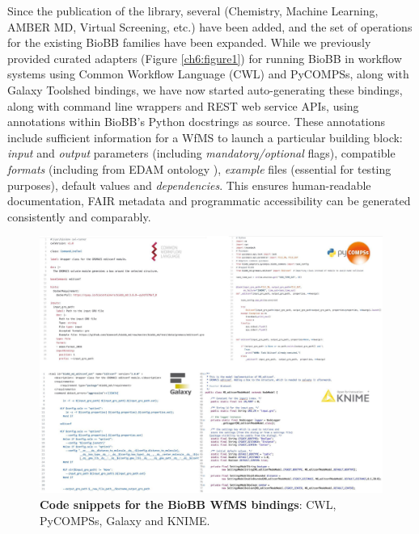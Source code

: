 Since the publication of the library, several  (Chemistry, Machine Learning, AMBER MD, Virtual Screening, etc.) have been added, and the set of operations for the existing BioBB families have been expanded.
While we previously provided curated adapters (Figure \vref{ch6:figure1}) for running BioBB in workflow systems using Common Workflow Language (CWL) and PyCOMPSs, along with Galaxy Toolshed bindings, we have now started auto-generating these bindings, along with command line wrappers and REST web service APIs, using annotations within BioBB's Python docstrings as source.
These annotations include sufficient information for a WfMS to launch a particular building block: \emph{input} and \emph{output} parameters (including \emph{mandatory/optional} flags), compatible \emph{formats} (including from EDAM ontology \cite{ch6-11}), \emph{example} files (essential for testing purposes), default values and \emph{dependencies}.
This ensures human-readable documentation, FAIR metadata and programmatic accessibility can be generated consistently and comparably.

\begin{figure}%
  \includegraphics[width=\textwidth]{figures/ch06/figure1.jpg}
	\caption[Code snippets for the BioBB WfMS bindings]{
    \textbf{Code snippets for the BioBB WfMS bindings}: 
    CWL, PyCOMPSs, Galaxy and KNIME.}
  \label{ch6:figure1}
\end{figure}


